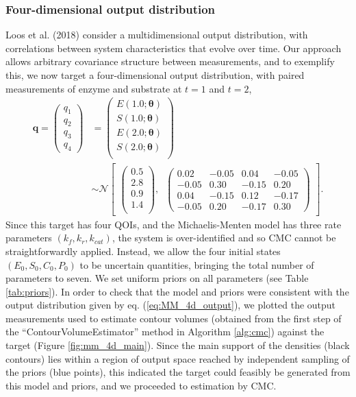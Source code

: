 \subsubsection{Four-dimensional output distribution}
Loos et al. (2018) consider a multidimensional output distribution, with correlations between system characteristics that evolve over time. Our approach allows arbitrary covariance structure between measurements, and to exemplify this, we now target a four-dimensional output distribution, with paired measurements of enzyme and substrate at $t=1$ and $t=2$,
%
\begin{equation}\label{eq:MM_4d_output}
\begin{aligned}
\boldsymbol{q} = \begin{pmatrix} q_1 \\ q_2 \\ q_3 \\ q_4 \end{pmatrix} &=
\begin{pmatrix}
E(1.0; \boldsymbol{\theta})\\
S(1.0; \boldsymbol{\theta})\\
E(2.0; \boldsymbol{\theta})\\
S(2.0; \boldsymbol{\theta})\\
\end{pmatrix}
\\
&\sim  \mathcal{N}
\begin{bmatrix}
\begin{pmatrix}
0.5\\
2.8\\
0.9\\
1.4\\
\end{pmatrix}, \;\;
\begin{pmatrix}
0.02 &  -0.05 &  0.04 & -0.05\\
-0.05 & 0.30  & -0.15 & 0.20\\
0.04 & -0.15  & 0.12  &  -0.17\\
-0.05 & 0.20 & -0.17 & 0.30
\end{pmatrix}
\end{bmatrix}.
\end{aligned}
\end{equation}
%
Since this target has four QOIs, and the Michaelis-Menten model has three rate parameters $(k_f,k_r,k_{cat})$, the system is over-identified and so CMC cannot be straightforwardly applied. Instead, we allow the four initial states $(E_0, S_0, C_0, P_0)$ to be uncertain quantities, bringing the total number of parameters to seven. We set uniform priors on all parameters (see Table \ref{tab:priors}). In order to check that the model and priors were consistent with the output distribution given by eq. (\ref{eq:MM_4d_output}), we plotted the output measurements used to estimate contour volumes (obtained from the first step of the ``ContourVolumeEstimator'' method in Algorithm \ref{alg:cmc}) against the target (Figure \ref{fig:mm_4d_main}). Since the main support of the densities (black contours) lies within a region of output space reached by independent sampling of the priors (blue points), this indicated the target could feasibly be generated from this model and priors, and we proceeded to estimation by CMC.

